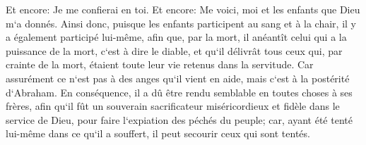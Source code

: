 \verse Et encore: Je me confierai en toi. Et encore: Me voici, moi et les enfants que Dieu m`a donnés. 
\verse Ainsi donc, puisque les enfants participent au sang et à la chair, il y a également participé lui-même, afin que, par la mort, il anéantît celui qui a la puissance de la mort, c`est à dire le diable, 
\verse et qu`il délivrât tous ceux qui, par crainte de la mort, étaient toute leur vie retenus dans la servitude. 
\verse Car assurément ce n`est pas à des anges qu`il vient en aide, mais c`est à la postérité d`Abraham. 
\verse En conséquence, il a dû être rendu semblable en toutes choses à ses frères, afin qu`il fût un souverain sacrificateur miséricordieux et fidèle dans le service de Dieu, pour faire l`expiation des péchés du peuple; 
\verse car, ayant été tenté lui-même dans ce qu`il a souffert, il peut secourir ceux qui sont tentés. 

